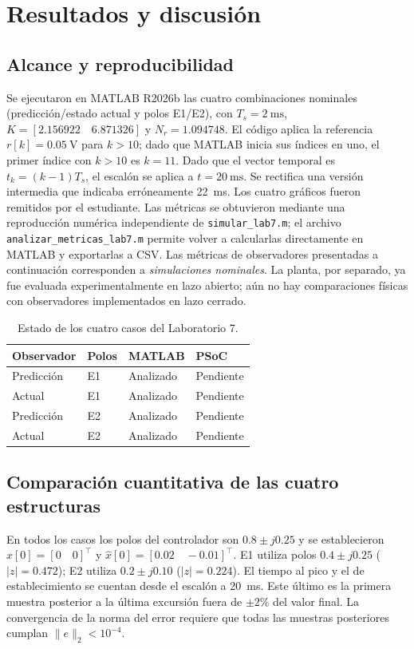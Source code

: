\section{Resultados y discusión}
\subsection{Alcance y reproducibilidad}
Se ejecutaron en MATLAB R2026b las cuatro combinaciones nominales
(predicción/estado actual y polos E1/E2), con
$T_s=\SI{2}{\milli\second}$, $K=[2.156922\quad 6.871326]$
y $N_r=1.094748$. El código aplica la referencia
$r[k]=\SI{0.05}{\volt}$ para $k>10$; dado que MATLAB inicia sus índices
en uno, el primer índice con $k>10$ es $k=11$. Dado que el
vector temporal es $t_k=(k-1)T_s$, el escalón se aplica a
$t=\SI{20}{\milli\second}$. Se rectifica una versión
intermedia que indicaba erróneamente \SI{22}{\milli\second}.
Los cuatro gráficos fueron remitidos por el estudiante.
Las métricas se obtuvieron mediante una reproducción numérica
independiente de \texttt{simular\_lab7.m}; el archivo
\texttt{analizar\_metricas\_lab7.m} permite volver a calcularlas
directamente en MATLAB y exportarlas a CSV. Las métricas de observadores presentadas a continuación corresponden a
\emph{simulaciones nominales}. La planta, por separado, ya fue evaluada
experimentalmente en lazo abierto; aún no hay comparaciones físicas
con observadores implementados en lazo cerrado.

\begin{table}[t]
\centering
\caption{Estado de los cuatro casos del Laboratorio 7.}
\label{tab:ensayos}
\small
\begin{tabular}{@{}llll@{}}
\toprule
Observador & Polos & MATLAB & PSoC \\
\midrule
Predicción & E1 & Analizado & Pendiente \\
Actual & E1 & Analizado & Pendiente \\
Predicción & E2 & Analizado & Pendiente \\
Actual & E2 & Analizado & Pendiente \\
\bottomrule
\end{tabular}
\end{table}

\subsection{Comparación cuantitativa de las cuatro estructuras}
En todos los casos los polos del controlador son
$0.8\pm j0.25$ y se establecieron
$x[0]=[0\quad0]^\top$ y
$\hat{x}[0]=[0.02\quad-0.01]^\top$.
E1 utiliza polos $0.4\pm j0.25$ ($|z|=0.472$);
E2 utiliza $0.2\pm j0.10$ ($|z|=0.224$).
El tiempo al pico y el de establecimiento se cuentan desde el
escalón a \SI{20}{\milli\second}. Este último es la primera
muestra posterior a la última excursión fuera de $\pm2\%$ del valor
final. La convergencia de la norma del error requiere que todas las
muestras posteriores cumplan $\|e\|_2<10^{-4}$.

